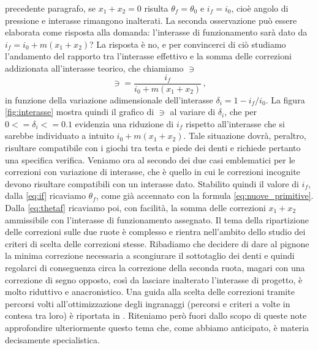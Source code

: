 precedente paragrafo, se $x_1 + x_2=0$ risulta $\theta_f=\theta_0$ e $i_f=i_0$,
 cio\`e angolo di pressione e interasse rimangono inalterati.
 La seconda osservazione pu\`o essere elaborata
come risposta alla domanda: l'interasse di funzionamento sar\`a dato da
 $i_f=i_0+m(x_1+x_2)$? La risposta \`e no, e per convincerci di ci\`o
studiamo l'andamento del rapporto tra l'interasse effettivo e la somma delle
correzioni addizionata all'interasse teorico, che chiamiamo $\ni$
\begin{equation}
\ni=\frac{i_f}{i_0+m(x_1+x_2)}\,,
\label{eq:ni}
\end{equation}
\noindent in funzione
della variazione adimensionale dell'interasse $\delta_i=1-i_f/i_0$.
\noindent La figura \ref{fig:interasse} mostra quindi il grafico di $\ni$
al variare di $\delta_i$, che per $0<=\delta_i<=0.1$  
evidenzia una riduzione di $i_f$ rispetto
all'interasse che si sarebbe individuato a intuito $i_0+m(x_1+x_2)$.
Tale situazione dovr\`a, peraltro, risultare compatibile con i giochi tra testa e piede
 dei denti e richiede pertanto una specifica verifica.
\vskip 3mm
\noindent Veniamo ora al secondo dei due casi emblematici
per le correzioni con variazione di interasse, che \`e quello 
in cui le correzioni incognite devono
risultare compatibili con un interasse dato. Stabilito quindi il valore di $i_f$,
dalla \ref{eq:if} ricaviamo $\theta_f$, come gi\`a accennato con la 
formula \ref{eq:nuove_primitive}.
Dalla \ref{eq:thetaf} ricaviamo poi,
con facilit\`a, la somma delle correzioni $x_1+x_2$ ammissibile con 
l'interasse di funzionamento assegnato. 
Il tema della ripartizione delle
correzioni sulle due ruote \`e complesso e rientra nell'ambito dello
studio dei criteri di scelta delle correzioni stesse. Ribadiamo che
decidere di dare al pignone la minima correzione necessaria a scongiurare
il sottotaglio dei denti e quindi regolarci di conseguenza circa la correzione
della seconda ruota, magari con una correzione di segno opposto, cos\`i
da lasciare inalterato l'interasse di progetto,
 \`e molto riduttivo e anacronistico. 
Una guida alla scelta delle correzioni tramite percorsi volti
 all'ottimizzazione degli ingranaggi (percorsi e criteri
 a volte in contesa
tra loro) \`e riportata in \cite{righettini}. Riteniamo per\`o fuori
dallo scopo di queste note approfondire ulteriormente questo tema che,
come abbiamo anticipato, \`e materia decisamente specialistica.
